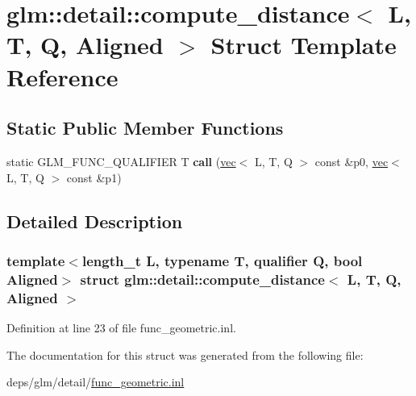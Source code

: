 \hypertarget{structglm_1_1detail_1_1compute__distance}{}\section{glm\+:\+:detail\+:\+:compute\+\_\+distance$<$ L, T, Q, Aligned $>$ Struct Template Reference}
\label{structglm_1_1detail_1_1compute__distance}
\subsection*{Static Public Member Functions}
\begin{DoxyCompactItemize}
\item 
\mbox{\label{structglm_1_1detail_1_1compute__distance_ac6bc3143c4460c61c56db42c2df5a8f8}} 
static G\+L\+M\+\_\+\+F\+U\+N\+C\+\_\+\+Q\+U\+A\+L\+I\+F\+I\+ER T {\bfseries call} (\hyperlink{structglm_1_1vec}{vec}$<$ L, T, Q $>$ const \&p0, \hyperlink{structglm_1_1vec}{vec}$<$ L, T, Q $>$ const \&p1)
\end{DoxyCompactItemize}


\subsection{Detailed Description}
\subsubsection*{template$<$length\+\_\+t L, typename T, qualifier Q, bool Aligned$>$\newline
struct glm\+::detail\+::compute\+\_\+distance$<$ L, T, Q, Aligned $>$}



Definition at line 23 of file func\+\_\+geometric.\+inl.



The documentation for this struct was generated from the following file\+:\begin{DoxyCompactItemize}
\item 
deps/glm/detail/\hyperlink{func__geometric_8inl}{func\+\_\+geometric.\+inl}\end{DoxyCompactItemize}
